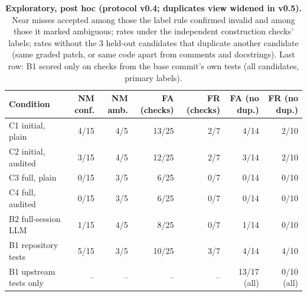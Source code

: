 \begin{table}[t]\centering\footnotesize
\caption{\textbf{Exploratory, post hoc (protocol v0.4; duplicates view widened in v0.5).} Near misses accepted among those the label rule confirmed invalid and among those it marked ambiguous; rates under the independent construction checks' labels; rates without the 3 held-out candidates that duplicate another candidate (same graded patch, or same code apart from comments and docstrings). Last row: B1 scored only on checks from the base commit's own tests (all candidates, primary labels).}\label{tab:posthoc}
\begin{tabular}{lrrrrrr}\toprule Condition & NM conf. & NM amb. & FA (checks) & FR (checks) & FA (no dup.) & FR (no dup.) \\\midrule
C1 initial, plain & 4/15 & 4/5 & 13/25 & 2/7 & 4/14 & 2/10 \\
C2 initial, audited & 3/15 & 4/5 & 12/25 & 2/7 & 3/14 & 2/10 \\
C3 full, plain & 0/15 & 3/5 & 6/25 & 0/7 & 0/14 & 0/10 \\
C4 full, audited & 0/15 & 3/5 & 6/25 & 0/7 & 0/14 & 0/10 \\
B2 full-session LLM & 1/15 & 4/5 & 8/25 & 0/7 & 1/14 & 0/10 \\
B1 repository tests & 5/15 & 3/5 & 10/25 & 3/7 & 4/14 & 4/10 \\
B1 upstream tests only & -- & -- & -- & -- & 13/17 (all) & 0/10 (all) \\
\bottomrule\end{tabular}\end{table}
